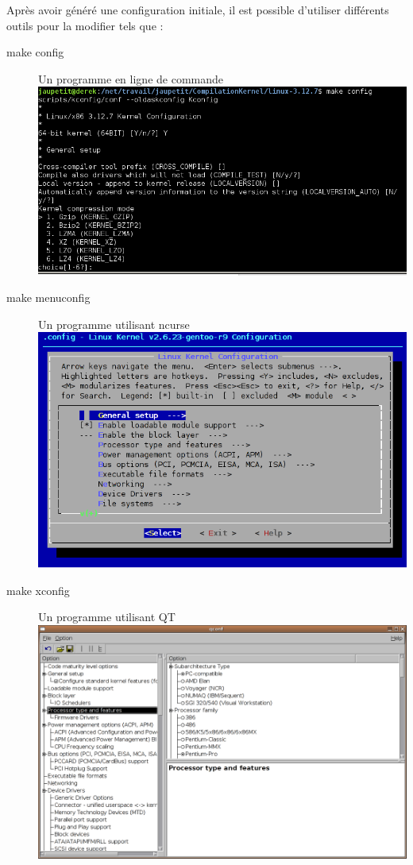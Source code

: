 \documentclass[16pts]{report}
\begin{document}
Après avoir généré une configuration initiale, il est possible d’utiliser
    différents outils pour la modifier tels que : 

\begin{description}
    \item[make config]      	Un programme en ligne de commande \\
        \includegraphics[scale=0.7]{illustrations/configLine.png} \pagebreak
    \item[make menuconfig]      Un programme utilisant ncurse \\ 
        \includegraphics[scale=0.7]{illustrations/menuconfig.png} \\
    \item[make xconfig]     	Un programme utilisant QT \\
        \includegraphics[scale=0.4]{illustrations/xconfig.png} \pagebreak

\end{description}
\end{document}
